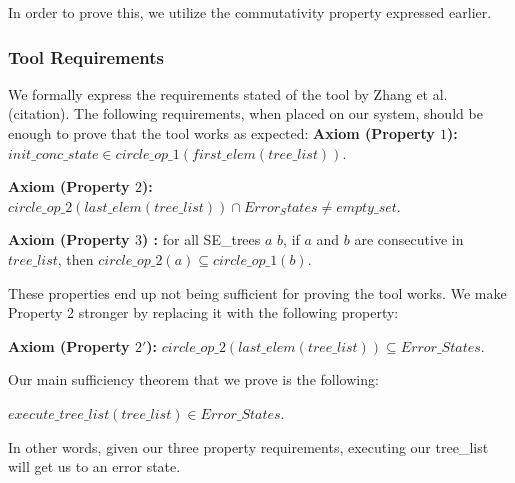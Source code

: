 In order to prove this, we utilize the commutativity property expressed earlier.


\subsubsection{Tool Requirements}
We formally express the requirements stated of the tool by Zhang et al. (citation).
The following requirements, when placed on our system, should be enough to prove that the tool works as expected:
\textbf{Axiom (Property $1$):} 
$init\_conc\_state \in circle\_op\_1 (first\_elem (tree\_list))$.

\textbf{Axiom (Property $2$):}
$ circle\_op\_2 (last\_elem (tree\_list)) \cap Error_States 
\neq empty\_set $.

\textbf{Axiom (Property $3$) :} 
for all SE\_trees $a$ $b$, 
if $a$ and $b$ are consecutive in $tree\_list$, then 
$circle\_op\_2 (a) \subseteq
circle\_op\_1 (b) $.

These properties end up not being sufficient for proving the tool works. 
We make Property 2 stronger by replacing it with the following property:

\textbf{Axiom (Property $2'$):}
$circle\_op\_2 (last\_elem (tree\_list))
\subseteq Error\_States $.



Our main sufficiency theorem that we prove is the following:
\begin{theorem}
$execute\_tree\_list (tree\_list) \in Error\_States$.
\end{theorem}
 In other words, given our three property requirements, executing our tree\_list will get us to an error state.